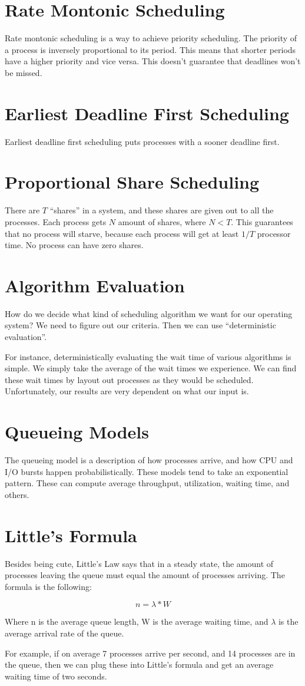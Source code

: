 \documentclass{article}
\begin{document}
\section{Rate Montonic Scheduling}
Rate montonic scheduling is a way to achieve priority scheduling. The priority
of a process is inversely proportional to its period. This means that shorter
periods have a higher priority and vice versa. This doesn't guarantee that
deadlines won't be missed.

\section{Earliest Deadline First Scheduling}
Earliest deadline first scheduling puts processes with a sooner deadline first.

\section{Proportional Share Scheduling}
There are $T$ ``shares'' in a system, and these shares are given out to all the
processes. Each process gets $N$ amount of shares, where $N<T$. This guarantees
that no process will starve, because each process will get at least $1/T$
processor time. No process can have zero shares.

\section{Algorithm Evaluation}
How do we decide what kind of scheduling algorithm we want for our operating
system? We need to figure out our criteria. Then we can use ``deterministic
evaluation''.

For instance, deterministically evaluating the wait time of various algorithms
is simple. We simply take the average of the wait times we experience.
We can find these wait times by layout out processes as they would be
scheduled. Unfortunately, our results are very dependent on what our input is.

\section{Queueing Models}
The queueing model is a description of how processes arrive, and how CPU and
I/O bursts happen probabilistically. These models tend to take an exponential
pattern. These can compute average throughput, utilization, waiting time, and
others.

\section{Little's Formula}
Besides being cute, Little's Law says that in a steady state, the amount of
processes leaving the queue must equal the amount of processes arriving.
The formula is the following:

$$n = \lambda * W$$

Where n is the average queue length, W is the average waiting time, and
$\lambda$ is the average arrival rate of the queue.

For example, if on average 7 processes arrive per second, and 14 processes
are in the queue, then we can plug these into Little's formula and get an
average waiting time of two seconds.
\end{document}
